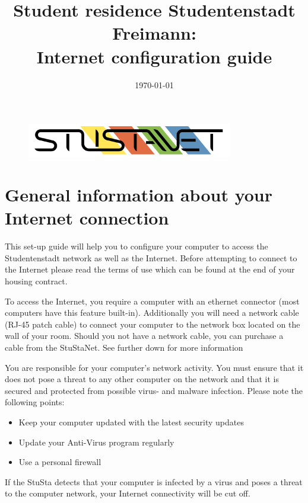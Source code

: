 \documentclass[a4paper,12pt]{scrartcl}
\title{Student residence Studentenstadt Freimann:\\
       Internet configuration guide}
\date{\today}
\begin{document}
\maketitle

\begin{figure}[t!]
   \centering
   \vspace{-20pt}
   \includegraphics[width=0.8\textwidth,keepaspectratio]{Bilder/StuStaNet_Logo}
   \vspace{-20pt}
\end{figure}

\section*{General information about your Internet connection}

This set-up guide will help you to configure your computer to access the Studentenstadt network as well as the Internet. Before attempting to connect to the Internet please read the terms of use which can be found at the end of your housing contract.

To access the Internet, you require a computer with an ethernet connector (most computers have this feature built-in). Additionally you will need a network cable (RJ-45 patch cable) to connect your computer to the network box located on the wall of your room. Should you not have a network cable, you can purchase a cable from the StuStaNet. See further down for more information

You are responsible for your computer's network activity. You must ensure that it does not pose a threat to any other computer on the network and that it is secured and protected from possible virus- and malware infection. Please note the following points:
\begin{itemize}
    \item Keep your computer updated with the latest security updates
    \item Update your Anti-Virus program regularly
    \item Use a personal firewall
\end{itemize}
If the StuSta detects that your computer is infected by a virus and poses a threat to the computer network, your Internet connectivity will be cut off.
\end{document}
